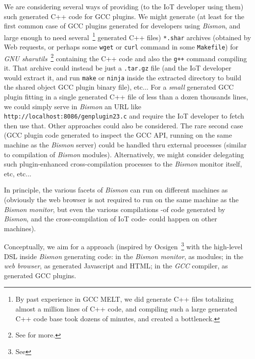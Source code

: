 \begin{itemize}
    We are considering several ways of providing (to the IoT developer
    using them) such generated C++ code for GCC plugins. We might
    generate (at least for the first common case of GCC plugins
    generated for developers using \emph{Bismon}, and large enough to
    need several~\footnote{By past experience in GCC MELT, we did
      generate C++ files totalizing almost a million lines of C++
      code, and compiling such a large generated C++ code base took
      dozens of minutes, and created a bottleneck.} generated C++
    files) \texttt{*.shar} archives (obtained by Web requests, or
    perhaps some \texttt{wget} or \texttt{curl} command in some
    \texttt{Makefile}) for \emph{GNU sharutils}~\footnote{See
       for more.}
    containing the C++ code and also the \texttt{g++} command
    compiling it. That archive could instead be just a
    \texttt{.tar.gz} file (and the IoT developer would extract it, and
    run \texttt{make} or \texttt{ninja} inside the extracted directory
    to build the shared object GCC plugin binary file), etc... For a
    \emph{small} generated GCC plugin fitting in a single generated
    C++ file of less than a dozen thousands lines, we could simply
    serve in \emph{Bismon} an URL like
    \texttt{http://localhost:8086/genplugin23.c} and require the IoT
    developer to fetch then use that. Other approaches could also be
    considered. The rare second case (GCC plugin code generated to
    inspect the GCC API, running on the same machine as the
    \emph{Bismon} server) could be handled thru external processes
    (similar to compilation of \emph{Bismon} modules). Alternatively,
    we might consider delegating such plugin-enhanced
    cross-compilation processes to the \emph{Bismon} monitor itself,
    etc, etc...
    
\end{itemize}

In principle, the various facets of \emph{Bismon} can run on different
machines as 
(obviously the web browser is not required to run on the same machine
as the \emph{Bismon monitor}, but even the various compilations -of
code generated by \emph{Bismon}, and the cross-compilation of IoT
code- could happen on other machines).

Conceptually, we aim for a  approach (inspired by
Ocsigen~\footnote{See } with the high-level
DSL inside \emph{Bismon} generating code: in the \emph{Bismon
  monitor}, as modules; in the \emph{web browser}, as generated
Javascript and HTML; in the \emph{GCC} compiler, as generated GCC plugins.


